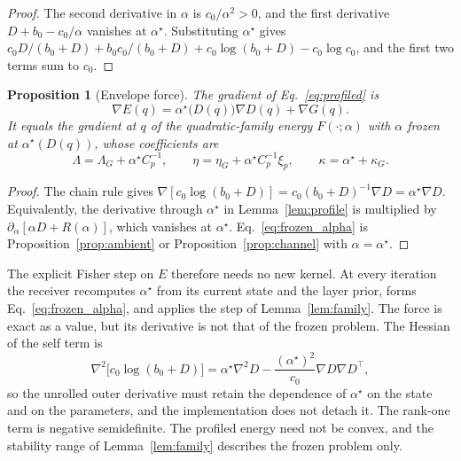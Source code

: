 \documentclass[11pt]{article}
\newtheorem{proposition}{Proposition}
\theoremstyle{definition}
\theoremstyle{remark}
\begin{document}
\begin{proof}
The second derivative in $\alpha$ is $c_0/\alpha^2>0$, and the first derivative $D+b_0-c_0/\alpha$ vanishes at $\alpha^\star$. Substituting $\alpha^\star$ gives $c_0D/(b_0+D)+b_0c_0/(b_0+D)+c_0\log(b_0+D)-c_0\log c_0$, and the first two terms sum to $c_0$.
\end{proof}

\begin{proposition}[Envelope force]
\label{prop:envelope}
The gradient of Eq.~\eqref{eq:profiled} is
\begin{equation}
\nabla E(q)=\alpha^\star\bigl(D(q)\bigr)\nabla D(q)+\nabla G(q).
\end{equation}
It equals the gradient at $q$ of the quadratic-family energy $F(\cdot;\alpha)$ with $\alpha$ frozen at $\alpha^\star(D(q))$, whose coefficients are
\begin{equation}
\Lambda=\Lambda_G+\alpha^\star C_p^{-1},\qquad \eta=\eta_G+\alpha^\star C_p^{-1}\xi_p,\qquad \kappa=\alpha^\star+\kappa_G.
\label{eq:frozen_alpha}
\end{equation}
\end{proposition}

\begin{proof}
The chain rule gives $\nabla[c_0\log(b_0+D)]=c_0(b_0+D)^{-1}\nabla D=\alpha^\star\nabla D$. Equivalently, the derivative through $\alpha^\star$ in Lemma~\ref{lem:profile} is multiplied by $\partial_\alpha[\alpha D+R(\alpha)]$, which vanishes at $\alpha^\star$. Eq.~\eqref{eq:frozen_alpha} is Proposition~\ref{prop:ambient} or Proposition~\ref{prop:channel} with $\alpha=\alpha^\star$.
\end{proof}

The explicit Fisher step on $E$ therefore needs no new kernel. At every iteration the receiver recomputes $\alpha^\star$ from its current state and the layer prior, forms Eq.~\eqref{eq:frozen_alpha}, and applies the step of Lemma~\ref{lem:family}. The force is exact as a value, but its derivative is not that of the frozen problem. The Hessian of the self term is
\begin{equation}
\nabla^2\bigl[c_0\log(b_0+D)\bigr]=\alpha^\star\nabla^2D-\frac{(\alpha^\star)^2}{c_0}\nabla D\nabla D^\top,
\end{equation}
so the unrolled outer derivative must retain the dependence of $\alpha^\star$ on the state and on the parameters, and the implementation does not detach it. The rank-one term is negative semidefinite. The profiled energy need not be convex, and the stability range of Lemma~\ref{lem:family} describes the frozen problem only.
\end{document}

